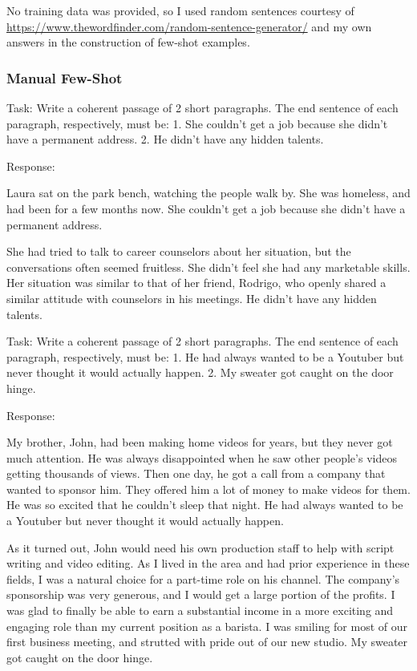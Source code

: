 \documentclass[11pt]{article}
\begin{document}
No training data was provided, so I used random sentences courtesy of \url{https://www.thewordfinder.com/random-sentence-generator/} and my own answers in the construction of few-shot examples.

\subsubsection*{Manual Few-Shot}

Task: Write a coherent passage of 2 short paragraphs. The end sentence of each paragraph, respectively, must be: 1. She couldn't get a job because she didn't have a permanent address. 2. He didn't have any hidden talents.

Response: 

Laura sat on the park bench, watching the people walk by. She was homeless, and had been for a few months now. She couldn't get a job because she didn't have a permanent address.

She had tried to talk to career counselors about her situation, but the conversations often seemed fruitless. She didn't feel she had any marketable skills. Her situation was similar to that of her friend, Rodrigo, who openly shared a similar attitude with counselors in his meetings. He didn't have any hidden talents.

Task: Write a coherent passage of 2 short paragraphs. The end sentence of each paragraph, respectively, must be: 1. He had always wanted to be a Youtuber but never thought it would actually happen. 2. My sweater got caught on the door hinge.

Response: 

My brother, John, had been making home videos for years, but they never got much attention. He was always disappointed when he saw other people's videos getting thousands of views. Then one day, he got a call from a company that wanted to sponsor him. They offered him a lot of money to make videos for them. He was so excited that he couldn't sleep that night. He had always wanted to be a Youtuber but never thought it would actually happen.

As it turned out, John would need his own production staff to help with script writing and video editing. As I lived in the area and had prior experience in these fields, I was a natural choice for a part-time role on his channel. The company's sponsorship was very generous, and I would get a large portion of the profits. I was glad to finally be able to earn a substantial income in a more exciting and engaging role than my current position as a barista. I was smiling for most of our first business meeting, and strutted with pride out of our new studio. My sweater got caught on the door hinge.
\end{document}
